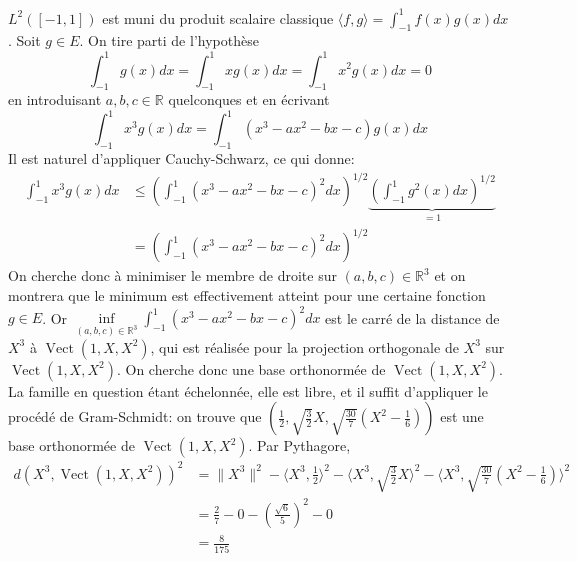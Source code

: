 \documentclass{report}
\DeclareMathOperator{\Vect}{Vect}
\begin{document}
\subsection{} \noindent{}\\ 
\\ 
\\
\noindent $L^2([-1,1])$ est muni du produit scalaire classique $\langle f,g\rangle = \int_{-1}^{1} f(x)g(x) dx$.\newline
 Soit $g\in E$. On tire parti de l'hypothèse $$\int_{-1}^1 g(x) dx = \int_{-1}^1 xg(x) dx = \int_{-1}^1 x^2g(x) dx =0$$ en introduisant $a,b,c\in \mathbb R$ quelconques et en écrivant $$\int_{-1}^1 x^3g(x) dx = \int_{-1}^1 (x^3-ax^2-bx-c)g(x) dx $$ 
Il est naturel d'appliquer Cauchy-Schwarz, ce qui donne: $$\begin{aligned}\int_{-1}^1 x^3g(x) dx &\leq \left(\int_{-1}^1 (x^3-ax^2-bx-c)^2 dx\right)^{1/2}\underbrace{\left(\int_{-1}^1 g^2(x) dx\right)^{1/2}}_{=1} \\ &= \left(\int_{-1}^1 (x^3-ax^2-bx-c)^2 dx\right)^{1/2}\end{aligned}$$
On cherche donc à minimiser le membre de droite sur $(a,b,c)\in \mathbb R^3$ et on montrera que le minimum est effectivement atteint pour une certaine fonction $g\in E$.\newline
\newline 
Or $\inf \limits_{(a,b,c)\in \mathbb R^3} \int_{-1}^1 (x^3-ax^2-bx-c)^2 dx$ est le carré de la distance de $X^3$ à $\Vect(1,X,X^2)$, qui est réalisée pour la projection orthogonale de $X^3$ sur $\Vect(1,X,X^2)$. On cherche donc une base orthonormée de $\Vect(1,X,X^2)$. La famille en question étant échelonnée, elle est libre, et il suffit d'appliquer le procédé de Gram-Schmidt: on trouve que $\left(\frac 12, \sqrt{\frac 32}X, \sqrt{\frac{30}{7}}\left(X^2-\frac 16 \right)\right)$ est une base orthonormée de $\Vect(1,X,X^2)$.\newline
Par Pythagore, $$\begin{aligned} d(X^3,\Vect(1,X,X^2))^2 &=\Big\|X^3\Big\|^2-\Big\langle X^3, \frac 12 \Big\rangle ^2 - \Big\langle X^3, \sqrt{\frac 32}X \Big\rangle ^2 - \Big\langle X^3, \sqrt{\frac{30}{7}}\left(X^2-\frac 16 \right) \Big\rangle ^2 \\
&= \frac 27 - 0 - \left( \frac{\sqrt 6}{5}\right)^2 -0\\
&= \frac{8}{175} \end{aligned}$$ 
\end{document}
